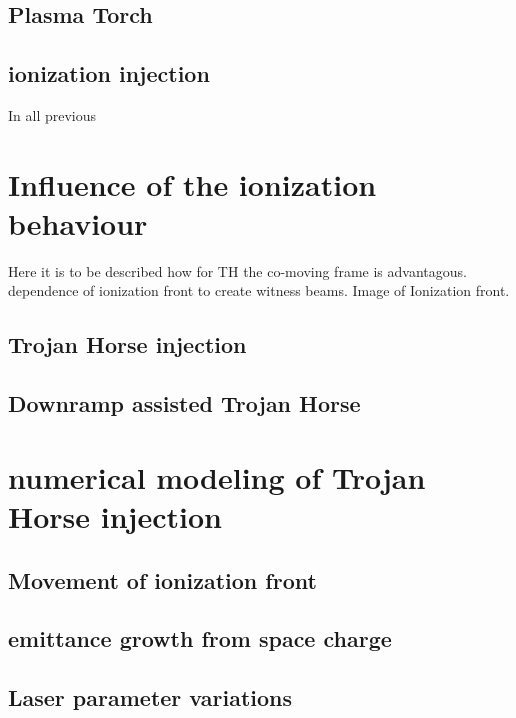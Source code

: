 \subsection{Plasma Torch}
\cite{PlaTo,PlaTo2}
\subsection{ionization injection}
In all previous 

\section{Influence of the ionization behaviour}
	Here it is to be described how for TH the co-moving frame is advantagous. dependence of ionization front to 
	create witness beams.
	Image of Ionization front.
	
	

\subsection{Trojan Horse injection}
\label{sec:Theory_TrojanHorse}
	
\subsection{Downramp assisted Trojan Horse}

\section{numerical modeling of Trojan Horse injection}

\subsection{Movement of ionization front}
\subsection{emittance growth from space charge}
\subsection{Laser parameter variations}
	
